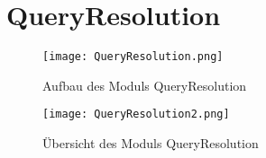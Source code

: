 
\section{QueryResolution}

\begin{figure}[htb]
    	\centering
  	\texttt{[image: QueryResolution.png]}
  	\caption{Aufbau des Moduls QueryResolution}
	\label{fig:Aufbau des Moduls QueryResolution}
\end{figure}

\begin{figure}[htb]
    	\centering
  	\texttt{[image: QueryResolution2.png]}
  	\caption{Übersicht des Moduls QueryResolution}
	\label{fig:Übersicht des Moduls QueryResolution}
\end{figure}


\newpage

\newpage

\newpage




